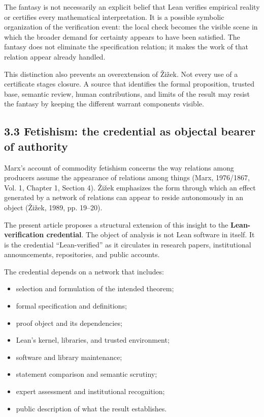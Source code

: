 \documentclass[sn-apa]{sn-jnl}
\begin{document}
The fantasy is not necessarily an explicit belief that Lean verifies empirical reality or certifies every mathematical interpretation. It is a possible symbolic organization of the verification event: the local check becomes the visible scene in which the broader demand for certainty appears to have been satisfied. The fantasy does not eliminate the specification relation; it makes the work of that relation appear already handled.

This distinction also prevents an overextension of Žižek. Not every use of a certificate stages closure. A source that identifies the formal proposition, trusted base, semantic review, human contributions, and limits of the result may resist the fantasy by keeping the different warrant components visible.

\subsection{3.3 Fetishism: the credential as objectal bearer of authority}

Marx’s account of commodity fetishism concerns the way relations among producers assume the appearance of relations among things (Marx, 1976/1867, Vol. 1, Chapter 1, Section 4). Žižek emphasizes the form through which an effect generated by a network of relations can appear to reside autonomously in an object (Žižek, 1989, pp. 19–20).

The present article proposes a structural extension of this insight to the \textbf{Lean-verification credential}. The object of analysis is not Lean software in itself. It is the credential “Lean-verified” as it circulates in research papers, institutional announcements, repositories, and public accounts.

The credential depends on a network that includes:

\begin{itemize}

\item selection and formulation of the intended theorem;

\item formal specification and definitions;

\item proof object and its dependencies;

\item Lean’s kernel, libraries, and trusted environment;

\item software and library maintenance;

\item statement comparison and semantic scrutiny;

\item expert assessment and institutional recognition;

\item public description of what the result establishes.

\end{itemize}
\end{document}
